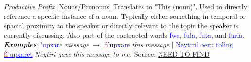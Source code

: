 \textit{Productive Prefix} [Nouns/Pronouns] Translates to "This (noun)".  Used to directly reference a specific instance of a noun.  Typically either something in temporal or spacial proximity to the speaker or directly relevant to the topic the speaker is currently discussing.  Also part of the contracted words \textcolor{Blue}{fwa}, \textcolor{Blue}{fula}, \textcolor{Blue}{futa}, and \textcolor{Blue}{furia}. \textit{\textbf{Examples}}: \textcolor{Blue}{'upxare}\textit{ message} $\rightarrow$ \textcolor{Red}{fì}\textcolor{Blue}{'upxare}\textit{ this message} | \textcolor{Blue}{Neytiril oeru tolìng \underline{\textcolor{Red}{fì}'upxaret}}\textit{ Neytiri gave this message to me.} Source: \hyperlink{naviteri.org}{NEED TO FIND}\par
